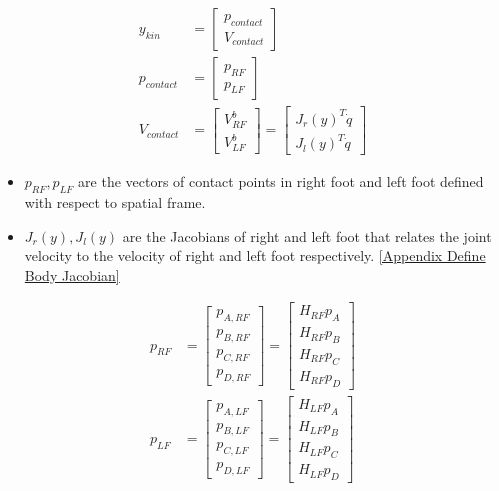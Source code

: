 \begin{enumerate}
\begin{equation}
    \begin{split}
    y_{kin} &=
    \begin{bmatrix}
    p_{contact} \\ V_{contact}
    \end{bmatrix}\\
    p_{contact} &= \begin{bmatrix}p_{RF}\\ p_{LF}\end{bmatrix}\\
     V_{contact} &= \begin{bmatrix} V_{RF}^b \\ V_{LF}^b \end{bmatrix} = \begin{bmatrix} J_r(y)^T \dot{q} \\ J_l(y)^T\dot{q} \end{bmatrix}
    \end{split}
\end{equation}
\begin{itemize}
\item $p_{RF},p_{LF}$ are the vectors of contact points in right foot and left foot defined with respect to spatial frame.
\item $J_r(y), J_l(y)$ are the Jacobians of right and left foot that relates the joint velocity to the velocity of right and left foot respectively. \underline{[Appendix Define Body Jacobian]}
\end{itemize}
\begin{equation}
    \begin{split}
    p_{RF} &= \begin{bmatrix} p_{A,RF}\\ p_{B,RF}\\ p_{C,RF}\\ p_{D,RF}\end{bmatrix}= \begin{bmatrix} H_{RF}p_{A}\\  H_{RF}p_{B}\\  H_{RF}p_{C}\\  H_{RF}p_{D}\end{bmatrix} \\
    p_{LF} &= \begin{bmatrix} p_{A,LF}\\ p_{B,LF}\\ p_{C,LF}\\ p_{D,LF}\end{bmatrix}= \begin{bmatrix} H_{LF}p_{A}\\  H_{LF}p_{B}\\  H_{LF}p_{C}\\  H_{LF}p_{D}\end{bmatrix} \\

\end{split}
\end{equation}
\end{enumerate}
